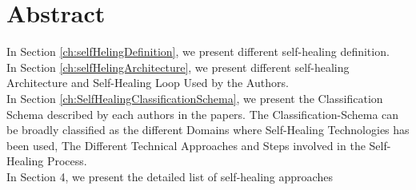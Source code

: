 \documentclass[a4paper,oneside]{scrreprt}
\begin{document}
\section*{Abstract}
In Section \ref{ch:selfHelingDefinition}, we present different self-healing definition.\\

In Section \ref{ch:selfHelingArchitecture}, we present different self-healing Architecture and Self-Healing Loop Used by the Authors.\\

In Section \ref{ch:SelfHealingClassificationSchema}, we present the Classification Schema described by each authors in the papers. The Classification-Schema can be broadly classified as the different Domains where Self-Healing Technologies has been used, The Different Technical Approaches and Steps involved in the Self-Healing Process.\\



In Section 4, we present the detailed list of self-healing approaches\\



\begin{versionhistory}

 
\end{versionhistory}


\tableofcontents
\cleardoublepage















\end{document}
